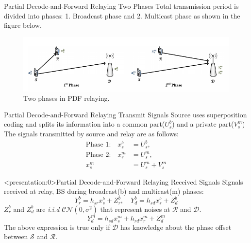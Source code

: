 \documentclass{beamer}
\begin{document}
\begin{frame}{Partial Decode-and-Forward Relaying} {Two Phases}
Total transmission period is divided into phases: 1. Broadcast phase and 2. Multicast phase as shown in the figure below.
\begin{figure}
\centering
\includegraphics[width=\textwidth]{figures/pdfRelaying.png}
  \caption{Two phases in PDF relaying.}
\end{figure}
\end{frame}

\begin{frame}{Partial Decode-and-Forward Relaying} {Transmit Signals}
Source uses superposition coding and splits its information into a
	common part($U_s^b$) and a private part($V_s^m$) \\ 
	\vspace{1cm}
The signals transmitted by source and relay are as follows:
\begin{align*}
\text{Phase 1:}\quad x^b_s &=  U_s^b, \\
\text{Phase 2:}\quad x_r^m &= U_s^{m}, \\ 
 x^m_s &= U_s^{m} + V_s^{m} 
\end{align*}
\vspace{-0.5cm}
\end{frame}

\begin{frame}<presentation:0>{Partial Decode-and-Forward Relaying} {Received Signals}
\vspace{-1cm}
Signals received at relay, BS during broadcast(b) and multicast(m) phases:
\begin{equation*}
Y_r^b = h_{sr}x^b_s + Z_r^b , \quad Y_d^b = h_{sd}x^b_s + Z_d^b
\end{equation*}
$Z_r^b$ and $Z_d^b$ are \textit{i.i.d} $\mathcal{CN}(0,\sigma^2)$ that represent noises at $\mathcal{R}$ and $\mathcal{D}$. \\
\pause
\begin{equation*}
Y_d^m = h_{sd}x^m_s + h_{rd}x_r^m + Z_d^m
\end{equation*}
The above expression is true only if $\mathcal{D}$ has knowledge about the phase offset between $\mathcal{S}$ and $\mathcal{R}$. 
\end{frame}
\end{document}
